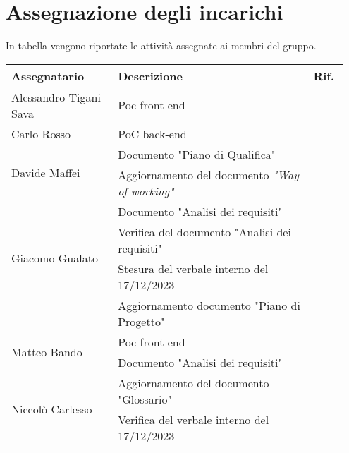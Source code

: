 \section{Assegnazione degli incarichi}
In tabella vengono riportate le attività assegnate ai membri del gruppo.
\begin{center}
	{
		\renewcommand{\arraystretch}{1.5}
		\begin{tabular}{p{0.30\linewidth}|p{0.55\linewidth}|p{0.10\linewidth}}
			\textbf{Assegnatario}                   & \textbf{Descrizione}                                  & \textbf{Rif.} \\
			\hline
			Alessandro Tigani Sava & Poc front-end                               &          \\
			\hline
			Carlo Rosso            & PoC back-end                        &           \\
			\hline
			\multirow{2}{*}{Davide Maffei}          & Documento "Piano di Qualifica"                        &         \\
			\cline{2-3}
			                                        & Aggiornamento del documento \textit{"Way of working"}           &           \\
			\cline{2-3}
			                                        & Documento "Analisi dei requisiti"        &           \\
			\hline
			\multirow{2}{*}{Giacomo Gualato}                         & Verifica del documento "Analisi dei requisiti"                    &          \\
			\cline{2-3}
			                                        & Stesura del verbale interno del 17/12/2023         &           \\
			\cline{2-3}
			                                        & Aggiornamento documento "Piano di Progetto"         &           \\										
			\hline
			\multirow{2}{*}{Matteo Bando}                            &  Poc front-end                    &          \\
			\cline{2-3}
			                                        & Documento "Analisi dei requisiti"        &           \\
			\hline
			\multirow{2}{*}{Niccolò Carlesso}                        &  Aggiornamento del documento "Glossario"                      &           \\
			\cline{2-3}
			                                        &  Verifica del verbale interno del 17/12/2023         &           \\
			\hline
		\end{tabular}
	}
\end{center}
